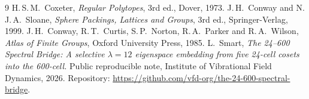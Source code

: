 \documentclass[11pt]{article}
\theoremstyle{plain}
\theoremstyle{definition}
\begin{document}
\begin{thebibliography}{9}
H.\,S.\,M.~Coxeter, \emph{Regular Polytopes}, 3rd ed., Dover, 1973.
J.\,H.~Conway and N.\,J.\,A.~Sloane, \emph{Sphere Packings, Lattices and
Groups}, 3rd ed., Springer-Verlag, 1999.
J.\,H.~Conway, R.\,T.~Curtis, S.\,P.~Norton, R.\,A.~Parker and R.\,A.~Wilson,
\emph{Atlas of Finite Groups}, Oxford University Press, 1985.
L.~Smart, \emph{The 24--600 Spectral Bridge: A selective $\lambda{=}12$
eigenspace embedding from five 24-cell cosets into the 600-cell.}
Public reproducible note, Institute of Vibrational Field Dynamics,
2026.  Repository:
\url{https://github.com/vfd-org/the-24-600-spectral-bridge}.
\end{thebibliography}
\end{document}
